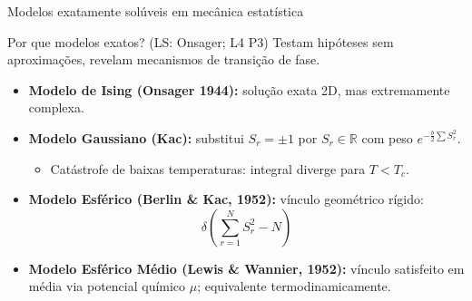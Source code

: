 \documentclass[10pt,aspectratio=169]{beamer}
\newcommand{\lista}[1]{\textcolor{qcdGreen!70!black}{\small(#1)}}
\begin{document}
\begin{frame}{Modelos exatamente solúveis em mecânica estatística}
  \begin{block}{Por que modelos exatos? \lista{LS: Onsager; L4 P3}}
    Testam hipóteses sem aproximações, revelam mecanismos de transição de fase.
  \end{block}
  \medskip
  \begin{itemize}
    \item<1-> \textbf{Modelo de Ising (Onsager 1944):} solução exata 2D, mas extremamente complexa.
    \item<2-> \textbf{Modelo Gaussiano (Kac):} substitui $S_r=\pm1$ por $S_r\in\mathbb{R}$
      com peso $e^{-\frac{b}{2}\sum S_r^2}$.
      \begin{itemize}
        \item<3-> \alert{Catástrofe de baixas temperaturas:} integral diverge para $T<T_c$.
      \end{itemize}
    \item<4-> \textbf{Modelo Esférico (Berlin \& Kac, 1952):} vínculo geométrico rígido:
      \[
        \delta\!\left(\sum_{r=1}^N S_r^2 - N\right)
      \]
    \item<5-> \textbf{Modelo Esférico Médio (Lewis \& Wannier, 1952):} vínculo satisfeito
      em média via potencial químico $\mu$; equivalente termodinamicamente.
  \end{itemize}
\end{frame}
\end{document}
